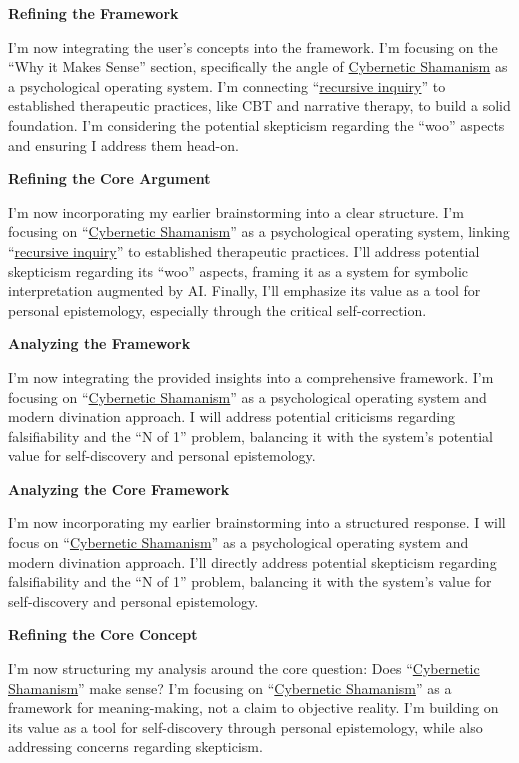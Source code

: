 \documentclass{article}
\begin{document}
\textbf{Refining the Framework}

I'm now integrating the user's concepts into the framework. I'm focusing on the ``Why it Makes Sense'' section, specifically the angle of \hyperlink{gloss:cybernetic_shamanism}{Cybernetic Shamanism} as a psychological operating system. I'm connecting ``\hyperlink{gloss:recursive_inquiry}{recursive inquiry}'' to established therapeutic practices, like CBT and narrative therapy, to build a solid foundation. I'm considering the potential skepticism regarding the ``woo'' aspects and ensuring I address them head-on.

\textbf{Refining the Core Argument}

I'm now incorporating my earlier brainstorming into a clear structure. I'm focusing on ``\hyperlink{gloss:cybernetic_shamanism}{Cybernetic Shamanism}'' as a psychological operating system, linking ``\hyperlink{gloss:recursive_inquiry}{recursive inquiry}'' to established therapeutic practices. I'll address potential skepticism regarding its ``woo'' aspects, framing it as a system for symbolic interpretation augmented by AI. Finally, I'll emphasize its value as a tool for personal epistemology, especially through the critical self-correction.

\textbf{Analyzing the Framework}

I'm now integrating the provided insights into a comprehensive framework. I'm focusing on ``\hyperlink{gloss:cybernetic_shamanism}{Cybernetic Shamanism}'' as a psychological operating system and modern divination approach. I will address potential criticisms regarding falsifiability and the ``N of 1'' problem, balancing it with the system's potential value for self-discovery and personal epistemology.

\textbf{Analyzing the Core Framework}

I'm now incorporating my earlier brainstorming into a structured response. I will focus on ``\hyperlink{gloss:cybernetic_shamanism}{Cybernetic Shamanism}'' as a psychological operating system and modern divination approach. I'll directly address potential skepticism regarding falsifiability and the ``N of 1'' problem, balancing it with the system's value for self-discovery and personal epistemology.

\textbf{Refining the Core Concept}

I'm now structuring my analysis around the core question: Does ``\hyperlink{gloss:cybernetic_shamanism}{Cybernetic Shamanism}'' make sense? I'm focusing on ``\hyperlink{gloss:cybernetic_shamanism}{Cybernetic Shamanism}'' as a framework for meaning-making, not a claim to objective reality. I'm building on its value as a tool for self-discovery through personal epistemology, while also addressing concerns regarding skepticism.
\end{document}
